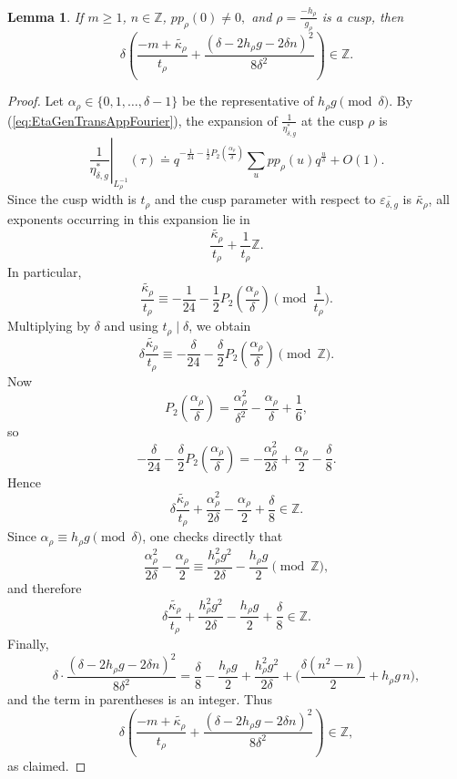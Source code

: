 \documentclass[10pt,a4paper]{amsart}
\newtheorem{lemma}{Lemma}
\begin{document}
	\begin{lemma}\label{lem:cuspParamLemma}
		If $m\ge 1$, $n\in \mathbb Z$, $pp_\rho(0)\neq 0,$  and $\rho=\frac{-h_\rho}{g_\rho}$ is a cusp, then
		\[
		\delta\left(\frac{-m+\widetilde{\kappa_\rho}}{t_\rho}+
		\frac{(\delta-2h_\rho g-2\delta n)^2}{8\delta^2}\right)\in \mathbb Z.
		\]
	\end{lemma}

	\begin{proof}
		Let $\alpha_\rho\in\{0,1,\dots,\delta-1\}$ be the representative of $h_\rho g \pmod{\delta}$.
		By (\ref{eq:EtaGenTransAppFourier}), the expansion of $\frac{1}{\eta_{\delta,g}^\ast}$ at the cusp $\rho$ is
		\[
		\left.\frac{1}{\eta^*_{\delta,g}}\right|_{L_\rho^{-1}}(\tau)
		\doteq
		q^{-\frac1{24}-\frac12P_2(\frac{\alpha_\rho}{\delta})}
		\sum_{u} pp_\rho(u) q^{\frac{u}{\delta}} + O(1).
		\]
		Since the cusp width is $t_\rho$ and the cusp parameter with respect to $\overline{\varepsilon_{\delta,g}}$ is $\widetilde{\kappa_\rho}$, all exponents occurring in this expansion lie in
		\[
		\frac{\widetilde{\kappa_\rho}}{t_\rho}+\frac{1}{t_\rho}\mathbb Z.
		\]
		In particular,
		\[
		\frac{\widetilde{\kappa_\rho}}{t_\rho}\equiv
		-\frac1{24}-\frac12P_2\!\left(\frac{\alpha_\rho}{\delta}\right)
		\pmod{\frac1{t_\rho}}.
		\]
		Multiplying by $\delta$ and using $t_\rho\mid \delta$, we obtain
		\[
		\delta\frac{\widetilde{\kappa_\rho}}{t_\rho}\equiv
		-\frac{\delta}{24}-\frac{\delta}{2}P_2\!\left(\frac{\alpha_\rho}{\delta}\right)
		\pmod{\mathbb Z}.
		\]
		Now
		\[
		P_2\!\left(\frac{\alpha_\rho}{\delta}\right)
		=\frac{\alpha_\rho^2}{\delta^2}-\frac{\alpha_\rho}{\delta}+\frac16,
		\]
		so
		\[
		-\frac{\delta}{24}-\frac{\delta}{2}P_2\!\left(\frac{\alpha_\rho}{\delta}\right)
		=
		-\frac{\alpha_\rho^2}{2\delta}+\frac{\alpha_\rho}{2}-\frac{\delta}{8}.
		\]
		Hence
		\[
		\delta\frac{\widetilde{\kappa_\rho}}{t_\rho}
		+\frac{\alpha_\rho^2}{2\delta}-\frac{\alpha_\rho}{2}+\frac{\delta}{8}\in \mathbb Z.
		\]
		Since $\alpha_\rho\equiv h_\rho g \pmod{\delta}$, one checks directly that
		\[
		\frac{\alpha_\rho^2}{2\delta}-\frac{\alpha_\rho}{2}
		\equiv
		\frac{h_\rho^2g^2}{2\delta}-\frac{h_\rho g}{2}
		\pmod{\mathbb Z},
		\]
		and therefore
		\[
		\delta\frac{\widetilde{\kappa_\rho}}{t_\rho}
		+\frac{h_\rho^2g^2}{2\delta}-\frac{h_\rho g}{2}+\frac{\delta}{8}\in \mathbb Z.
		\]
		Finally,
		\[
		\delta\cdot \frac{(\delta-2h_\rho g-2\delta n)^2}{8\delta^2}
		=
		\frac{\delta}{8}-\frac{h_\rho g}{2}+\frac{h_\rho^2g^2}{2\delta}
		+\bigg(\frac{\delta(n^2-n)}{2}+h_\rho g\,n\bigg),
		\]
		and the term in parentheses is an integer. Thus
		\[
		\delta\left(\frac{-m+\widetilde{\kappa_\rho}}{t_\rho}+
		\frac{(\delta-2h_\rho g-2\delta n)^2}{8\delta^2}\right)\in \mathbb Z,
		\]
		as claimed.
	\end{proof}
\end{document}
